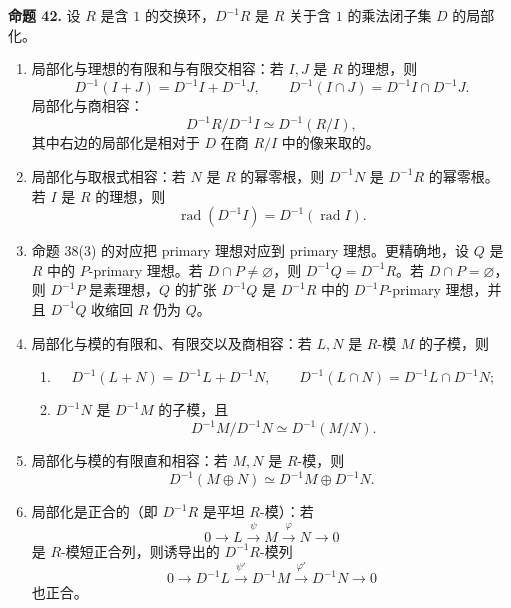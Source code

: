 \noindent\textbf{命题 42.} 设 $R$ 是含 $1$ 的交换环，$D^{-1}R$ 是 $R$ 关于含 $1$ 的乘法闭子集 $D$ 的局部化。
\begin{enumerate}[label=(\arabic*)]
	\item 局部化与理想的有限和与有限交相容：若 $I,J$ 是 $R$ 的理想，则
	\[
	D^{-1}(I+J)=D^{-1}I+D^{-1}J,
	\qquad
	D^{-1}(I\cap J)=D^{-1}I\cap D^{-1}J.
	\]
	局部化与商相容：
	\[
	D^{-1}R/D^{-1}I\simeq D^{-1}(R/I),
	\]
	其中右边的局部化是相对于 $D$ 在商 $R/I$ 中的像来取的。
	
	\item 局部化与取根式相容：若 $N$ 是 $R$ 的幂零根，则 $D^{-1}N$ 是 $D^{-1}R$ 的幂零根。若 $I$ 是 $R$ 的理想，则
	\[
	\operatorname{rad}(D^{-1}I)=D^{-1}(\operatorname{rad}I).
	\]
	
	\item 命题 38(3) 的对应把 primary 理想对应到 primary 理想。更精确地，设 $Q$ 是 $R$ 中的 $P$-primary 理想。若 $D\cap P\ne\varnothing$，则 $D^{-1}Q=D^{-1}R$。若 $D\cap P=\varnothing$，则 $D^{-1}P$ 是素理想，$Q$ 的扩张 $D^{-1}Q$ 是 $D^{-1}R$ 中的 $D^{-1}P$-primary 理想，并且 $D^{-1}Q$ 收缩回 $R$ 仍为 $Q$。
	
	\item 局部化与模的有限和、有限交以及商相容：若 $L,N$ 是 $R$-模 $M$ 的子模，则
	\begin{enumerate}[label=(\alph*)]
		\item
		\[
		D^{-1}(L+N)=D^{-1}L+D^{-1}N,
		\qquad
		D^{-1}(L\cap N)=D^{-1}L\cap D^{-1}N;
		\]
		\item $D^{-1}N$ 是 $D^{-1}M$ 的子模，且
		\[
		D^{-1}M/D^{-1}N\simeq D^{-1}(M/N).
		\]
	\end{enumerate}
	
	\item 局部化与模的有限直和相容：若 $M,N$ 是 $R$-模，则
	\[
	D^{-1}(M\oplus N)\simeq D^{-1}M\oplus D^{-1}N.
	\]
	
	\item 局部化是正合的（即 $D^{-1}R$ 是平坦 $R$-模）：若
	\[
	0\longrightarrow L\overset{\psi}{\longrightarrow} M\overset{\varphi}{\longrightarrow} N\longrightarrow0
	\]
	是 $R$-模短正合列，则诱导出的 $D^{-1}R$-模列
	\[
	0\longrightarrow D^{-1}L\overset{\psi'}{\longrightarrow} D^{-1}M\overset{\varphi'}{\longrightarrow} D^{-1}N\longrightarrow0
	\]
	也正合。
\end{enumerate}


